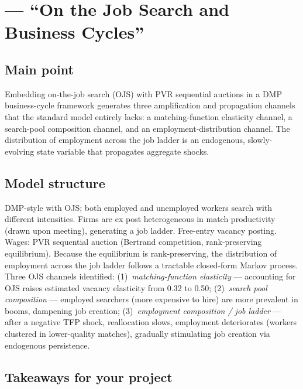 \documentclass[12pt]{article}
\begin{document}
\section{\citet{moscarini2024} --- ``On the Job Search and Business Cycles''}

\subsection*{Main point}

Embedding on-the-job search (OJS) with PVR sequential auctions in a DMP business-cycle framework generates three amplification and propagation channels that the standard model entirely lacks: a matching-function elasticity channel, a search-pool composition channel, and an employment-distribution channel. The distribution of employment across the job ladder is an endogenous, slowly-evolving state variable that propagates aggregate shocks.

\subsection*{Model structure}

DMP-style with OJS; both employed and unemployed workers search with different intensities. Firms are ex post heterogeneous in match productivity (drawn upon meeting), generating a job ladder. Free-entry vacancy posting. Wages: PVR sequential auction (Bertrand competition, rank-preserving equilibrium). Because the equilibrium is rank-preserving, the distribution of employment across the job ladder follows a tractable closed-form Markov process. Three OJS channels identified: (1)~\emph{matching-function elasticity} --- accounting for OJS raises estimated vacancy elasticity from 0.32 to 0.50; (2)~\emph{search pool composition} --- employed searchers (more expensive to hire) are more prevalent in booms, dampening job creation; (3)~\emph{employment composition / job ladder} --- after a negative TFP shock, reallocation slows, employment deteriorates (workers clustered in lower-quality matches), gradually stimulating job creation via endogenous persistence.

\subsection*{Takeaways for your project}
\end{document}

